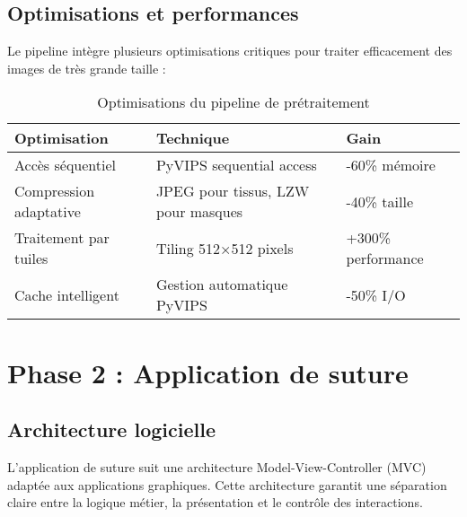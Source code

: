 \documentclass[12pt,a4paper]{report}
\begin{document}
\subsection{Optimisations et performances}

Le pipeline intègre plusieurs optimisations critiques pour traiter efficacement des images de très grande taille :

\begin{table}[H]
\centering
\caption{Optimisations du pipeline de prétraitement}
\label{tab:optimisations_pipeline}
\begin{tabular}{|l|l|l|}
\hline
\textbf{Optimisation} & \textbf{Technique} & \textbf{Gain} \\
\hline
Accès séquentiel & PyVIPS sequential access & -60\% mémoire \\
Compression adaptative & JPEG pour tissus, LZW pour masques & -40\% taille \\
Traitement par tuiles & Tiling 512×512 pixels & +300\% performance \\
Cache intelligent & Gestion automatique PyVIPS & -50\% I/O \\
\hline
\end{tabular}
\end{table}

\section{Phase 2 : Application de suture}

\subsection{Architecture logicielle}

L'application de suture suit une architecture Model-View-Controller (MVC) adaptée aux applications graphiques. Cette architecture garantit une séparation claire entre la logique métier, la présentation et le contrôle des interactions.
\end{document}
